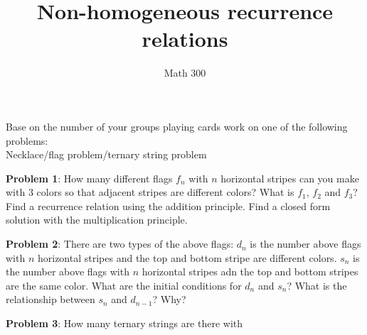 \documentclass[11pt]{amsart}
\title{Non-homogeneous recurrence relations}
\author{Math 300}
\begin{document}
\maketitle

Base on the number of your groups playing cards work on one of the following problems:\\

Necklace/flag problem/ternary string problem


{\bf  Problem 1}:  How many different flags $f_n$ with $n$ horizontal stripes can you make with $3$ colors so that adjacent stripes are different colors?  What is $f_1$, $f_2$ and $f_3$? Find a recurrence relation using the addition principle.  Find a closed form solution with the multiplication principle.
\vfill

{\bf Problem 2}: There are two types of the above flags:  $d_n$ is the number above flags with $n$ horizontal stripes and the top and bottom stripe are different colors. $s_n$ is the number above flags with $n$ horizontal stripes adn the top and bottom stripes are the same color.  What are the initial conditions for $d_n$ and $s_n$?  What is the relationship between $s_n$ and $d_{n-1}$?  Why?
\vfill

{\bf Problem 3}: How many ternary strings are there with\vfill
\end{document}
